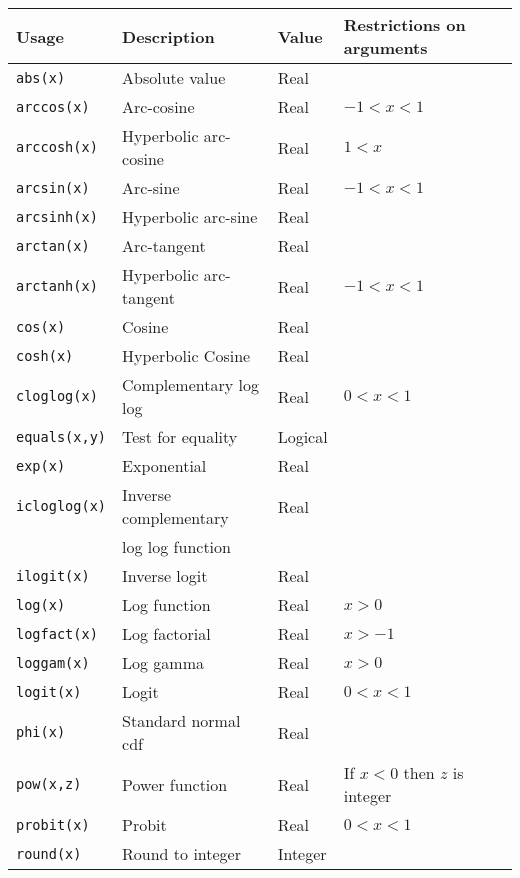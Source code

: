 \documentclass[11pt, a4paper, titlepage]{report}
\begin{document}
\begin{table}
\begin{center}
\begin{tabular}{llll}
\hline
Usage  & Description & Value & Restrictions on arguments \\ 
\hline
\verb+abs(x)+       & Absolute value        & Real & \\
\verb+arccos(x)+    & Arc-cosine            & Real & $-1 < x < 1$\\
\verb+arccosh(x)+   & Hyperbolic arc-cosine & Real & $1 < x$ \\
\verb+arcsin(x)+    & Arc-sine              & Real & $-1 < x < 1$\\
\verb+arcsinh(x)+   & Hyperbolic arc-sine   & Real &\\
\verb+arctan(x)+    & Arc-tangent           & Real &\\
\verb+arctanh(x)+   & Hyperbolic arc-tangent & Real & $-1 < x < 1$\\
\verb+cos(x)+       & Cosine              & Real & \\
\verb+cosh(x)+      & Hyperbolic Cosine   & Real & \\
\verb+cloglog(x)+    & Complementary log log & Real & $0 < x < 1$ \\
\verb+equals(x,y)+   & Test for equality   & Logical & \\
\verb+exp(x)+       & Exponential         & Real & \\
\verb+icloglog(x)+  & Inverse complementary & Real & \\
                    & log log function    & \\
\verb+ilogit(x)+    & Inverse logit       & Real & \\
\verb+log(x)+       & Log function        & Real & $x > 0$ \\
\verb+logfact(x)+   & Log factorial       & Real & $x > -1$ \\
\verb+loggam(x)+    & Log gamma           & Real & $x > 0$ \\
\verb+logit(x)+     & Logit               & Real & $0 < x < 1$ \\
\verb+phi(x)+       & Standard normal cdf & Real & \\
\verb+pow(x,z)+     & Power function      & Real & If $x < 0$ then $z$ is integer \\ 
\verb+probit(x)+    & Probit              & Real & $0 < x < 1$ \\
\verb+round(x)+     & Round to integer    & Integer & \\

\end{tabular}
\end{center}
\end{table}
\end{document}
